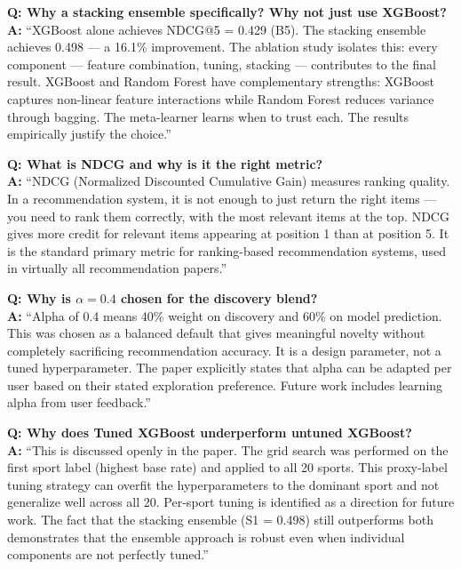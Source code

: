 \documentclass[12pt,a4paper]{article}
\begin{document}
\begin{qabox}
\textbf{Q: Why a stacking ensemble specifically? Why not just use XGBoost?}\\[4pt]
\textbf{A:} ``XGBoost alone achieves NDCG@5 = 0.429 (B5). The stacking
ensemble achieves 0.498 --- a 16.1\% improvement. The ablation study
isolates this: every component --- feature combination, tuning, stacking ---
contributes to the final result. XGBoost and Random Forest have complementary
strengths: XGBoost captures non-linear feature interactions while Random Forest
reduces variance through bagging. The meta-learner learns when to trust each.
The results empirically justify the choice.''
\end{qabox}

\begin{qabox}
\textbf{Q: What is NDCG and why is it the right metric?}\\[4pt]
\textbf{A:} ``NDCG (Normalized Discounted Cumulative Gain) measures ranking
quality. In a recommendation system, it is not enough to just return the right
items --- you need to rank them correctly, with the most relevant items at the
top. NDCG gives more credit for relevant items appearing at position 1 than at
position 5. It is the standard primary metric for ranking-based recommendation
systems, used in virtually all recommendation papers.''
\end{qabox}

\begin{qabox}
\textbf{Q: Why is $\alpha = 0.4$ chosen for the discovery blend?}\\[4pt]
\textbf{A:} ``Alpha of 0.4 means 40\% weight on discovery and 60\% on model
prediction. This was chosen as a balanced default that gives meaningful novelty
without completely sacrificing recommendation accuracy. It is a design
parameter, not a tuned hyperparameter. The paper explicitly states that alpha
can be adapted per user based on their stated exploration preference. Future
work includes learning alpha from user feedback.''
\end{qabox}

\begin{qabox}
\textbf{Q: Why does Tuned XGBoost underperform untuned XGBoost?}\\[4pt]
\textbf{A:} ``This is discussed openly in the paper. The grid search was
performed on the first sport label (highest base rate) and applied to all 20
sports. This proxy-label tuning strategy can overfit the hyperparameters to
the dominant sport and not generalize well across all 20. Per-sport tuning is
identified as a direction for future work. The fact that the stacking ensemble
(S1 = 0.498) still outperforms both demonstrates that the ensemble approach
is robust even when individual components are not perfectly tuned.''
\end{qabox}
\end{document}

